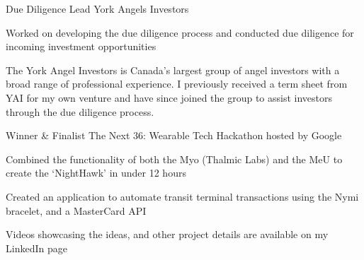 

\begin{cventries}
  \cventry
    {Due Diligence Lead} %
    {York Angels Investors} %
    {} %
    {} %
    {
      \begin{cvitems}
            {
            \item {Worked on developing the due diligence process and conducted due diligence for incoming investment opportunities}
            }
      \end{cvitems}
    }
    {
         \begin{cventrysummary}
     The York Angel Investors is Canada's largest group of angel investors with a broad range of professional experience. I previously received a term sheet from YAI for my own venture and have since joined the group to assist investors through the due diligence process.
     \end{cventrysummary}
    }
\vspace{-1.5mm}

  \cventry
    {Winner \& Finalist} %
    {The Next 36: Wearable Tech Hackathon hosted by Google} %
    {} %
    {} %
    {
      \begin{cvitems}
            {
            \item {Combined the functionality of both the Myo (Thalmic Labs) and the MeU to create the ‘NightHawk’ in under 12 hours}
            \item {Created an application to automate transit terminal transactions using the Nymi bracelet, and a MasterCard API}
            \item {Videos showcasing the ideas, and other project details are available on my LinkedIn page}
            }
      \end{cvitems}
    }
    {}

\end{cventries}
